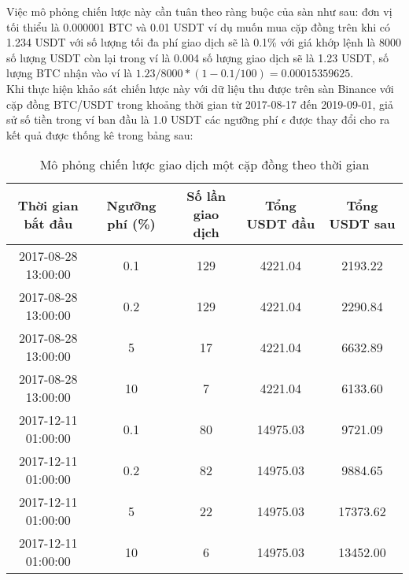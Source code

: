 Việc mô phỏng chiến lược này cần tuân theo ràng buộc của sàn như sau: đơn vị tối thiểu là 0.000001 BTC và 0.01 USDT ví dụ muốn mua cặp đồng trên khi có 1.234 USDT với số lượng tối đa phí giao dịch sẽ là 0.1\% với giá khớp lệnh là 8000 số lượng USDT còn lại trong ví là 0.004 số lượng giao dịch sẽ là 1.23 USDT, số lượng BTC nhận vào ví là $1.23/8000*(1-0.1/100) = 0.00015359625$.\\

Khi thực hiện khảo sát chiến lược này với dữ liệu thu được trên sàn Binance với cặp đồng BTC/USDT trong khoảng thời gian từ 2017-08-17
đến 2019-09-01, giả sử số tiền trong ví ban đầu là 1.0 USDT các ngưỡng phí  $\epsilon$ được thay đổi cho ra kết quả được thống kê trong bảng sau:
\begin{table}[ht]
\caption{Mô phỏng chiến lược giao dịch một cặp đồng theo thời gian} %
\centering %
\begin{tabular}{c c c c c} %
\hline\hline %
Thời gian bắt đầu & Ngưỡng phí (\%) & Số lần giao dịch & Tổng USDT đầu & Tổng USDT sau \\ [0.5ex] %

\hline %
2017-08-28 13:00:00 & 0.1 & 129 & 4221.04 & 2193.22 \\ %
2017-08-28 13:00:00 & 0.2 & 129 & 4221.04 & 2290.84 \\
2017-08-28 13:00:00 & 5 & 17 & 4221.04 & 6632.89 \\
2017-08-28 13:00:00 & 10 & 7 & 4221.04 & 6133.60 \\

2017-12-11 01:00:00 & 0.1 & 80 & 14975.03 & 9721.09 \\
2017-12-11 01:00:00 & 0.2 & 82 & 14975.03 & 9884.65 \\
2017-12-11 01:00:00 & 5 & 22 & 14975.03 & 17373.62 \\
2017-12-11 01:00:00 & 10 & 6 & 14975.03 & 13452.00 \\[1ex] %



\hline %
\end{tabular}
\label{table:nonlin} %
\end{table}

